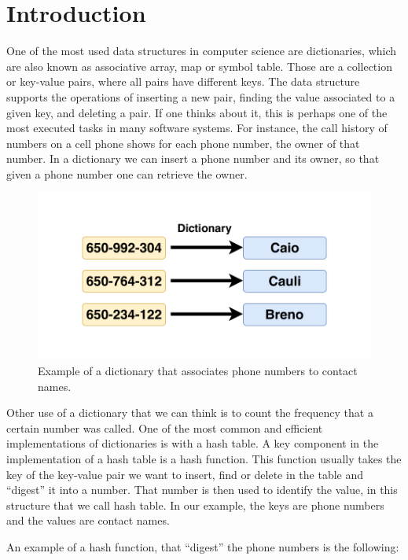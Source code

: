 \chapter{Introduction}
\label{cap:Introduction}

One of the most used data structures in computer science are dictionaries, which are also known as associative array, map or symbol table. Those are a collection or key-value pairs, where all pairs have different keys. The data structure supports the operations of inserting a new pair, finding the value associated to a given key, and deleting a pair. If one thinks about it, this is perhaps one of the most executed tasks in many software systems. For instance, the call history of numbers on a cell phone shows for each phone number, the owner of that number. In a dictionary we can insert a phone number and its owner, so that given a phone number one can retrieve the owner. 


\begin{figure}[h!]
  \centering
  \includegraphics[width=12cm]{figuras/dictionary-example.pdf}
  \caption{Example of a dictionary that associates phone numbers to contact names. }
\end{figure}

Other use of a dictionary that we can think is to count the frequency that a certain number was called. One of the most common and efficient implementations of dictionaries is with a hash table. A key component in the implementation of a hash table is a hash function. This function usually takes the key of the key-value pair we want to insert, find or delete in the table and ``digest'' it into a number. That number is then used to identify the value, in this structure that we call hash table. In our example, the keys are phone numbers and the values are contact names.

An example of a hash function, that ``digest'' the phone numbers is the following: \\

